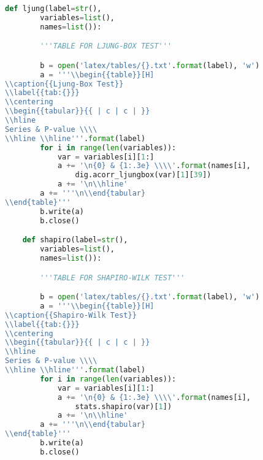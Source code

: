 \begin{lstlisting}[language=Python]
    def ljung(label=str(),
        variables=list(),
        names=list()):

        '''TABLE FOR LJUNG-BOX TEST'''

        b = open('latex/tables/{}.txt'.format(label), 'w')
        a = '''\\begin{{table}}[H]
\\caption{{Ljung-Box Test}}
\\label{{tab:{}}}
\\centering
\\begin{{tabular}}{{ | c | c | }}
\\hline
Series & P-value \\\\
\\hline \\hline'''.format(label)
        for i in range(len(variables)):
            var = variables[i][1:]
            a += '\n{0} & {1:.3e} \\\\'.format(names[i],
                dig.acorr_ljungbox(var)[1][39])
            a += '\n\\hline'
        a += '''\n\\end{tabular}
\\end{table}'''
        b.write(a)
        b.close()

    def shapiro(label=str(),
        variables=list(),
        names=list()):

        '''TABLE FOR SHAPIRO-WILK TEST'''

        b = open('latex/tables/{}.txt'.format(label), 'w')
        a = '''\\begin{{table}}[H]
\\caption{{Shapiro-Wilk Test}}
\\label{{tab:{}}}
\\centering
\\begin{{tabular}}{{ | c | c | }}
\\hline
Series & P-value \\\\
\\hline \\hline'''.format(label)
        for i in range(len(variables)):
            var = variables[i][1:]
            a += '\n{0} & {1:.3e} \\\\'.format(names[i],
                stats.shapiro(var)[1])
            a += '\n\\hline'
        a += '''\n\\end{tabular}
\\end{table}'''
        b.write(a)
        b.close()


\end{lstlisting}
